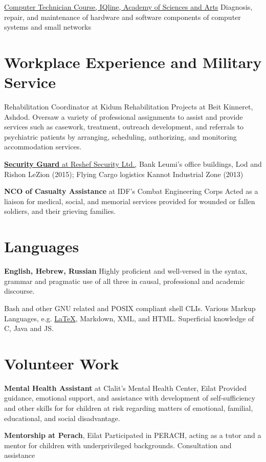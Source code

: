 {\href{https://www.dropbox.com/s/csphxdynjdg3ze2/computer-technitian-certificate.jpg?dl=0}{Computer Technician Course, IQline, Academy of Sciences and Arts}}
{Diagnosis, repair, and maintenance of hardware and software components of computer systems and small networks}
{}

\section{Workplace Experience and Military Service}

{Rehabilitation Coordinator at Kidum Rehabilitation Projects at Beit Kinneret, Ashdod.}
{Oversaw a variety of professional assignments to assist and provide services such as casework, treatment, outreach development, and referrals to psychiatric patients by arranging, scheduling, authorizing, and monitoring accommodation services.}
{}

{\href{https://www.dropbox.com/s/kr5rcui1zgp35i0/recommendation-letter-security-guard.jpg?dl=0}{\textbf{Security Guard} at Reshef Security Ltd.,}} 
{Bank Leumi's office buildings, Lod and Rishon LeZion (2015);
Flying Cargo logistics Kannot Industrial Zone (2013)}
{}

{\textbf{NCO of Casualty Assistance} at IDF's Combat Engineering Corps} 
{Acted as a liaison for medical, social, and memorial services provided for wounded or fallen soldiers, and their grieving families.}
{}

\section{Languages}

{\textbf{English, Hebrew, Russian}}
{Highly proficient and well-versed in the syntax, grammar and pragmatic use of all three in causal, professional and academic discourse.}
{}

{Bash and other GNU related and POSIX compliant shell CLIs. Various Markup Languages, e.g. \href{https://github.com/kiril-u/cv/}{\LaTeX}, Markdown, XML, and HTML. Superficial knowledge of C, Java and JS.}
{}

\section{Volunteer Work}

{\textbf{Mental Health Assistant} at Clalit's Mental Health Center, Eilat}
{Provided guidance, emotional support, and assistance with development of self-sufficiency and other skills for for children at risk regarding matters of emotional, familial, educational, and social disadvantage.}
{}

{\textbf{Mentorship at Perach}, Eilat}
{Participated in PERACH, acting as a tutor and a mentor for children with underprivileged backgrounds. Consultation and assistance }
{} 
\unsetLTR
